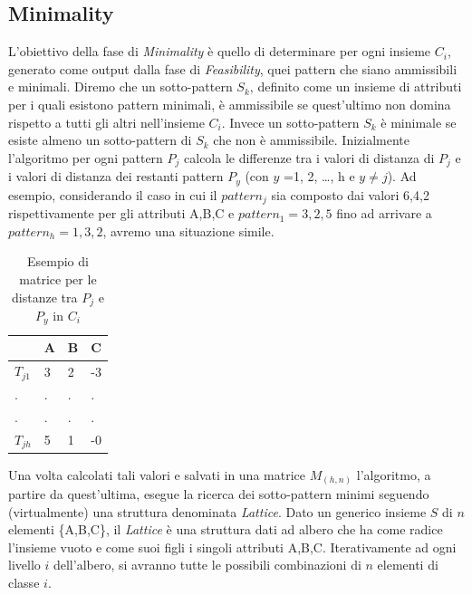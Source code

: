 \subsection{Minimality}
L'obiettivo della fase di \emph{Minimality} è quello di determinare per ogni insieme $C_i$, generato come output dalla fase di \emph{Feasibility}, quei pattern che siano ammissibili e minimali. Diremo che un sotto-pattern $S_k$, definito come un insieme di attributi per i quali esistono pattern minimali, è ammissibile se quest'ultimo non domina rispetto a tutti gli altri nell'insieme $C_i$. Invece un sotto-pattern $S_k$ è minimale se esiste almeno un sotto-pattern di $S_k$ che non è ammissibile. Inizialmente l'algoritmo per ogni pattern $P_j$ calcola le differenze tra i valori di distanza di $P_j$ e i valori di distanza dei restanti pattern $P_y$ (con $y$ =1, 2, \ldots, h e $y \neq j$).  Ad esempio, considerando il caso in cui il $pattern_j$ sia composto dai valori 6,4,2 rispettivamente per gli attributi A,B,C e $pattern_1 = 3,2,5$ fino ad arrivare a $pattern_h = 1,3,2$, avremo una situazione simile.
\begin{table}[H]
	\centering
	\begin{tabular}{ | l | l | l | l |}
		\hline
		& A & B & C \\
		\hline
		$T_{j1}$ & 3 & 2 & -3\\
		\hline
		. & . & . & .\\ 
		\hline
		. & . & . & . \\  
		\hline 
		$T_{jh}$ & 5 & 1 & -0\\ 
		\hline
	\end{tabular}
 \caption{Esempio di matrice per le distanze tra $P_j$ e $P_y$ in $C_i$}
 \label{tab:table esempio}
\end{table}
Una volta calcolati tali valori e salvati in una matrice $M_{(h,n)}$ l'algoritmo, a partire da quest'ultima, esegue la ricerca dei sotto-pattern minimi seguendo (virtualmente) una struttura denominata \emph{Lattice}. Dato un generico insieme $S$ di $n$ elementi \{A,B,C\}, il \emph{Lattice} è una struttura dati ad albero che ha come radice l'insieme vuoto e come suoi figli i singoli attributi A,B,C. Iterativamente ad ogni livello $i$ dell'albero, si avranno tutte le possibili combinazioni di $n$ elementi di classe $i$.\\
